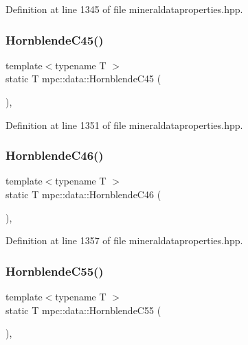 Definition at line 1345 of file mineraldataproperties.\+hpp.

\mbox{\label{namespacempc_1_1data_a8b2f87bf61968a18585675bdc0f01c3b}} 
\subsubsection{\texorpdfstring{Hornblende\+C45()}{HornblendeC45()}}
{\footnotesize\ttfamily template$<$typename T $>$ \\
static T mpc\+::data\+::\+Hornblende\+C45 (\begin{DoxyParamCaption}{ }\end{DoxyParamCaption})\hspace{0.3cm}{\ttfamily [inline]}, {\ttfamily [static]}}



Definition at line 1351 of file mineraldataproperties.\+hpp.

\mbox{\label{namespacempc_1_1data_af79af0cf116ff23799fbe84e629d2d6e}} 
\subsubsection{\texorpdfstring{Hornblende\+C46()}{HornblendeC46()}}
{\footnotesize\ttfamily template$<$typename T $>$ \\
static T mpc\+::data\+::\+Hornblende\+C46 (\begin{DoxyParamCaption}{ }\end{DoxyParamCaption})\hspace{0.3cm}{\ttfamily [inline]}, {\ttfamily [static]}}



Definition at line 1357 of file mineraldataproperties.\+hpp.

\mbox{\label{namespacempc_1_1data_a4563eb08ac0672f5b54cb0ebbe3f72c0}} 
\subsubsection{\texorpdfstring{Hornblende\+C55()}{HornblendeC55()}}
{\footnotesize\ttfamily template$<$typename T $>$ \\
static T mpc\+::data\+::\+Hornblende\+C55 (\begin{DoxyParamCaption}{ }\end{DoxyParamCaption})\hspace{0.3cm}{\ttfamily [inline]}, {\ttfamily [static]}}



